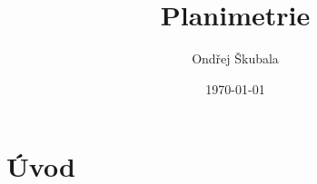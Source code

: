 \documentclass[12pt,a4paper]{article}
\title{Planimetrie}
\author{Ondřej Škubala}
\date{\today}
\begin{document}
\maketitle
\newpage

\section{Úvod}
\end{document}
